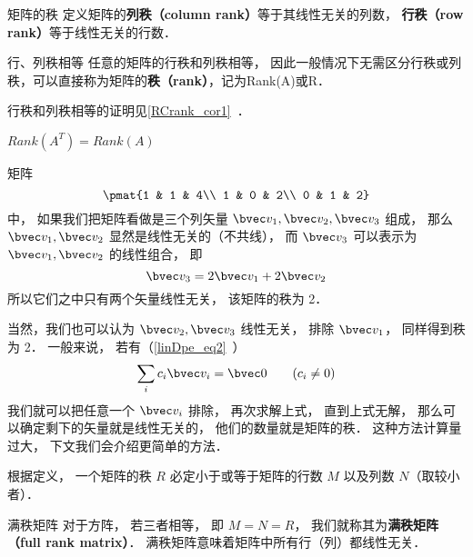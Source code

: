 

\begin{definition}{矩阵的秩}
定义矩阵的\textbf{列秩（column rank）}等于其线性无关的列数， \textbf{行秩（row rank）}等于线性无关的行数．
\end{definition}

\begin{theorem}{行、列秩相等}
任意的矩阵的行秩和列秩相等， 因此一般情况下无需区分行秩或列秩，可以直接称为矩阵的\textbf{秩（rank）}，记为Rank(A)或R．
\end{theorem}
行秩和列秩相等的证明见\autoref{RCrank_cor1}~．
\begin{corollary}{}
$Rank (A^T)=Rank(A)$
\end{corollary}

\begin{example}{}
矩阵
\begin{equation}\label{MatRnk_eq1}
\pmat{1 & 1 & 4\\ 1 & 0 & 2\\ 0 & 1 & 2}
\end{equation}
中， 如果我们把矩阵看做是三个列矢量 $\bvec v_1, \bvec v_2, \bvec v_3$ 组成， 那么 $\bvec v_1, \bvec v_2$ 显然是线性无关的（不共线）， 而 $\bvec v_3$ 可以表示为 $\bvec v_1, \bvec v_2$ 的线性组合， 即
\begin{equation}
\bvec v_3 = 2\bvec v_1 + 2\bvec v_2
\end{equation}
所以它们之中只有两个矢量线性无关， 该矩阵的秩为 2．

当然，我们也可以认为 $\bvec v_2, \bvec v_3$ 线性无关， 排除 $\bvec v_1$， 同样得到秩为 2． 一般来说， 若有（\autoref{linDpe_eq2}~）
\begin{equation}
\sum_i c_i \bvec v_i = \bvec 0 \qquad (c_i \ne 0)
\end{equation}
我们就可以把任意一个 $\bvec v_i$ 排除， 再次求解上式， 直到上式无解， 那么可以确定剩下的矢量就是线性无关的， 他们的数量就是矩阵的秩． 这种方法计算量过大， 下文我们会介绍更简单的方法．
\end{example}

\begin{theorem}{}
根据定义， 一个矩阵的秩 $R$ 必定小于或等于矩阵的行数 $M$ 以及列数 $N$（取较小者）． 
\end{theorem}

\begin{definition}{满秩矩阵}
对于方阵， 若三者相等， 即 $M = N = R$， 我们就称其为\textbf{满秩矩阵（full rank matrix）}． 满秩矩阵意味着矩阵中所有行（列）都线性无关．
\end{definition}

